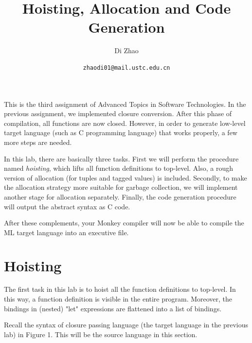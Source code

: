 \documentclass{article}
\theoremstyle{definition}
\theoremstyle{remark}
\numberwithin{equation}{section}
\begin{document}
\newcommand{\env}[1]{[\![#1]\!]\kappa}
\newcommand{\round}[1]{(\!|#1|\!)}

\title{Hoisting, Allocation and Code Generation}%
\author{Di Zhao}%
\date{\small{\texttt{zhaodi01@mail.ustc.edu.cn}}}%

\maketitle

This is the third assignment of Advanced Topics in Software
Technologies. In the previous assignment, we implemented closure conversion.
After this phase of compilation, all functions are now closed. However, in
order to generate low-level target language (such as C programming language)
that works properly, a few more steps are needed.

In this lab, there are basically three tasks. First we will perform the procedure
named \emph{hoisting}, which lifts all function definitions to top-level.
Also, a rough version of allocation (for tuples and tagged values) is included.
Secondly, to make the allocation strategy more suitable for garbage collection,
we will implement another stage for allocation separately. Finally, the code
generation procedure will output the abstract syntax as C code.

After these complements, your Monkey compiler will now be able to compile the ML
target language into an executive file.

\section{Hoisting}

The first task in this lab is to hoist all the function definitions
to top-level. In this way, a function definition is visible in the
entire program. Moreover, the bindings in (nested) "let" expressions are flattened
into a list of bindings. %

Recall the syntax of closure passing language (the target language in the previous lab)
 in Figure 1. This will be the source language in this section.
\end{document}
